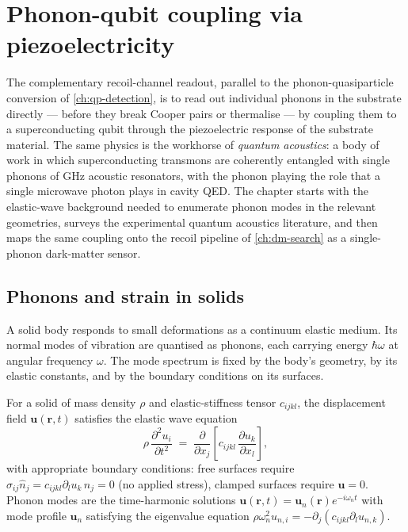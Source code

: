 \chapter{Phonon-qubit coupling via piezoelectricity}
\label{ch:phonon-qubit-piezo}

The complementary recoil-channel readout, parallel to the
phonon-quasiparticle conversion of \cref{ch:qp-detection}, is to
read out individual phonons in the substrate directly --- before
they break Cooper pairs or thermalise --- by coupling them to a
superconducting qubit through the piezoelectric response of the
substrate material. The same physics is the workhorse of
\emph{quantum acoustics}: a body of work in which superconducting
transmons are coherently entangled with single phonons of GHz
acoustic resonators, with the phonon playing the role that a
single microwave photon plays in cavity QED. The chapter starts
with the elastic-wave background needed to enumerate phonon modes
in the relevant geometries, surveys the experimental quantum
acoustics literature, and then maps the same coupling onto the
recoil pipeline of \cref{ch:dm-search} as a single-phonon
dark-matter sensor.

\section{Phonons and strain in solids}
\label{sec:phonon-modes}

\begin{phenomenon}
A solid body responds to small deformations as a continuum elastic
medium. Its normal modes of vibration are quantised as phonons,
each carrying energy $\hbar\omega$ at angular frequency $\omega$.
The mode spectrum is fixed by the body's geometry, by its
elastic constants, and by the boundary conditions on its
surfaces.
\end{phenomenon}

\begin{statement}
\label{stmt:elastic-modes}
For a solid of mass density $\rho$ and elastic-stiffness tensor
$c_{ijkl}$, the displacement field $\bm u(\bm r,t)$ satisfies the
elastic wave equation~\cite{tinkham2004}
\begin{equation}
\label{eq:elastic-wave}
\rho\,\frac{\partial^2 u_i}{\partial t^2}
\;=\; \frac{\partial}{\partial x_j}
\left[c_{ijkl}\,\frac{\partial u_k}{\partial x_l}\right],
\end{equation}
with appropriate boundary conditions: free surfaces require
$\sigma_{ij}\hat n_j = c_{ijkl}\partial_l u_k\,\hat n_j = 0$ (no
applied stress), clamped surfaces require $\bm u = 0$. Phonon
modes are the time-harmonic solutions
$\bm u(\bm r,t) = \bm u_n(\bm r) e^{-i\omega_n t}$ with mode
profile $\bm u_n$ satisfying the eigenvalue equation
$\rho \omega_n^2 u_{n,i} = -\partial_j(c_{ijkl}\partial_l u_{n,k})$.
\end{statement}

